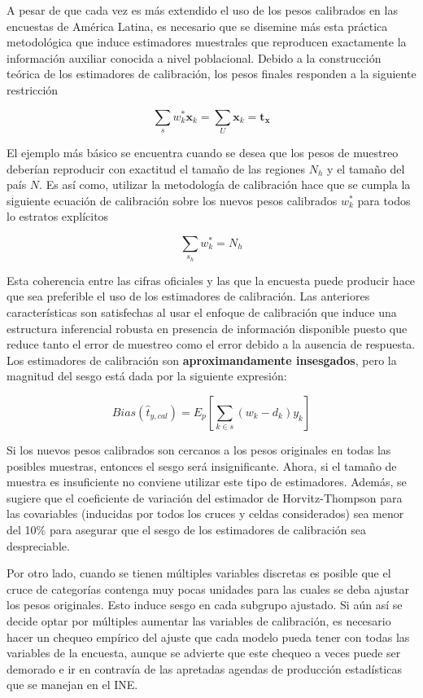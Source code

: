 \documentclass[12pt,spanish,]{book}
\begin{document}
A pesar de que cada vez es más extendido el uso de los pesos calibrados en las encuestas de América Latina, es necesario que se disemine más esta práctica metodológica que induce estimadores muestrales que reproducen exactamente la información auxiliar conocida a nivel poblacional. Debido a la construcción teórica de los estimadores de calibración, los pesos finales responden a la siguiente restricción

\[
\sum_{s}w^*_{k}\boldsymbol{x}_k = \sum_{U}\boldsymbol{x}_{k} = \boldsymbol{t}_{\boldsymbol{x}}
\]

El ejemplo más básico se encuentra cuando se desea que los pesos de muestreo deberían reproducir con exactitud el tamaño de las regiones \(N_h\) y el tamaño del país \(N\). Es así como, utilizar la metodología de calibración \autocite{Deville_Sarndal_1992} hace que se cumpla la siguiente ecuación de calibración sobre los nuevos pesos calibrados \(w_k^*\) para todos lo estratos explícitos

\[
\sum_{s_h} w_k^* = N_h
\]

Esta coherencia entre las cifras oficiales y las que la encuesta puede producir hace que sea preferible el uso de los estimadores de calibración. Las anteriores características son satisfechas al usar el enfoque de calibración que induce una estructura inferencial robusta en presencia de información disponible puesto que reduce tanto el error de muestreo como el error debido a la ausencia de respuesta. Los estimadores de calibración son \textbf{aproximandamente insesgados}, pero la magnitud del sesgo está dada por la siguiente expresión:

\[
Bias(\hat{t}_{y, cal}) = E_p \left[ \sum_{k \in s} (w_k - d_k) y_k \right]
\]

Si los nuevos pesos calibrados son cercanos a los pesos originales en todas las posibles muestras, entonces el sesgo será insignificante. Ahora, si el tamaño de muestra es insuficiente no conviene utilizar este tipo de estimadores. Además, se sugiere que el coeficiente de variación del estimador de Horvitz-Thompson para las covariables (inducidas por todos los cruces y celdas considerados) sea menor del 10\% para asegurar que el sesgo de los estimadores de calibración sea despreciable.

Por otro lado, cuando se tienen múltiples variables discretas es posible que el cruce de categorías contenga muy pocas unidades para las cuales se deba ajustar los pesos originales. Esto induce sesgo en cada subgrupo ajustado. Si aún así se decide optar por múltiples aumentar las variables de calibración, es necesario hacer un chequeo empírico del ajuste que cada modelo pueda tener con todas las variables de la encuesta, aunque se advierte que este chequeo a veces puede ser demorado e ir en contravía de las apretadas agendas de producción estadísticas que se manejan en el INE.
\end{document}
